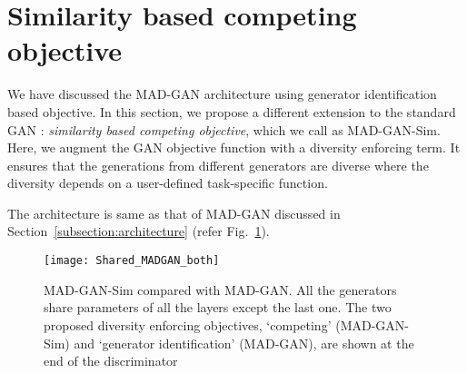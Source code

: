 \section{Similarity based competing objective}
\label{sec:competing}
We have discussed the MAD-GAN architecture using generator identification based objective. In this section, we propose a different extension to the standard GAN : {\em similarity based competing objective}, which we call as MAD-GAN-Sim. Here, we augment the GAN objective function with a diversity enforcing term. It ensures that the generations from different generators are diverse where the diversity depends on a user-defined task-specific function.

The architecture is same as that of MAD-GAN discussed in Section~\ref{subsection:architecture} (refer Fig.~\ref{fig:multiAgentGAN_both}).

\begin{figure}[ht]
	\centering
	\texttt{[image: Shared\_MADGAN\_both]}
	\caption{MAD-GAN-Sim compared with MAD-GAN. All the generators share parameters of all the layers except the last one. The two proposed diversity enforcing objectives, `competing' (MAD-GAN-Sim) and `generator identification' (MAD-GAN), are shown at the end of the discriminator}
	\label{fig:multiAgentGAN_both}
\end{figure}

